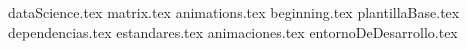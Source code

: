 \documentclass[11pt,oneside]{book}%
\begin{document}
	\maketitle
	{dataScience.tex}
	{matrix.tex}
	{animations.tex}
	\frontmatter
		\tableofcontents
		{beginning.tex} 
	\mainmatter
	{plantillaBase.tex}
	{dependencias.tex}
	{estandares.tex}
	{animaciones.tex}
	{entornoDeDesarrollo.tex}
\end{document}
